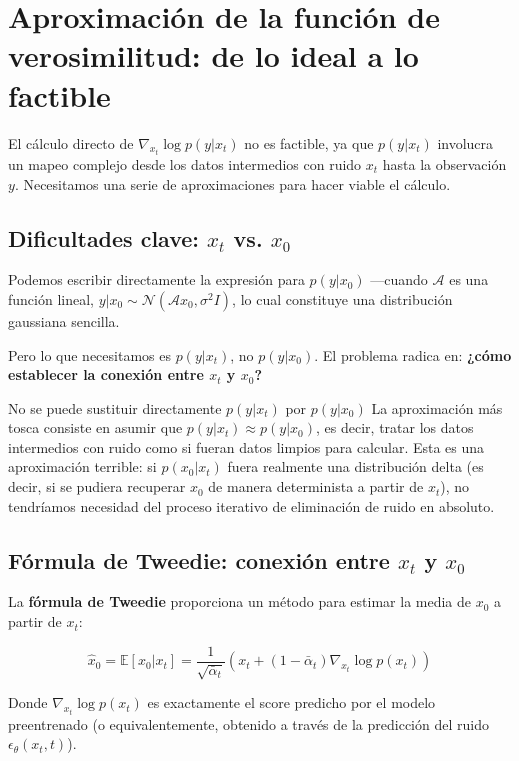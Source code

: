 \section{Aproximación de la función de verosimilitud: de lo ideal a lo factible}

El cálculo directo de $\nabla_{x_t} \log p(y | x_t)$ no es factible, ya que $p(y | x_t)$ involucra un mapeo complejo desde los datos intermedios con ruido $x_t$ hasta la observación $y$. Necesitamos una serie de aproximaciones para hacer viable el cálculo.

\subsection{Dificultades clave: $x_t$ vs. $x_0$}

Podemos escribir directamente la expresión para $p(y | x_0)$ —cuando $\mathcal{A}$ es una función lineal, $y | x_0 \sim \mathcal{N}(\mathcal{A} x_0, \sigma^2 I)$, lo cual constituye una distribución gaussiana sencilla.

Pero lo que necesitamos es $p(y | x_t)$, no $p(y | x_0)$. El problema radica en: \textbf{¿cómo establecer la conexión entre $x_t$ y $x_0$?}

\begin{warningbox}{No se puede sustituir directamente $p(y|x_t)$ por $p(y|x_0)$}
La aproximación más tosca consiste en asumir que $p(y|x_t) \approx p(y|x_0)$, es decir, tratar los datos intermedios con ruido como si fueran datos limpios para calcular. Esta es una aproximación terrible: si $p(x_0|x_t)$ fuera realmente una distribución delta (es decir, si se pudiera recuperar $x_0$ de manera determinista a partir de $x_t$), no tendríamos necesidad del proceso iterativo de eliminación de ruido en absoluto.
\end{warningbox}

\subsection{Fórmula de Tweedie: conexión entre $x_t$ y $x_0$}

La \textbf{fórmula de Tweedie} proporciona un método para estimar la media de $x_0$ a partir de $x_t$:

$$
\hat{x}_0 = \mathbb{E}[x_0 | x_t] = \frac{1}{\sqrt{\bar{\alpha}_t}} \left( x_t + (1 - \bar{\alpha}_t) \nabla_{x_t} \log p(x_t) \right)
$$

Donde $\nabla_{x_t} \log p(x_t)$ es exactamente el score predicho por el modelo preentrenado (o equivalentemente, obtenido a través de la predicción del ruido $\epsilon_\theta(x_t, t)$).

